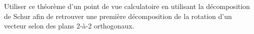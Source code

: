 \begin{theorem}
\end{theorem}

\begin{theorem}
\end{theorem}

\begin{remark}
	Utiliser ce théorème d'un point de vue calculatoire en utilisant la décomposition de Schur
	afin de retrouver une première décomposition de la rotation d'un vecteur selon des plans 2-à-2 orthogonaux.
\end{remark}

